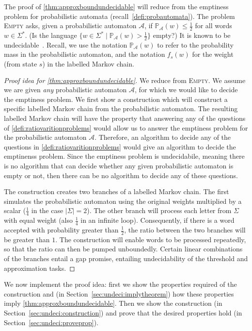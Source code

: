 \documentclass[10pt,a4paper]{amsart}
\numberwithin{equation}{section}
\theoremstyle{plain}
\theoremstyle{definition}
\theoremstyle{remark}
\newcommand\pr{\mathbb{P}}
\renewcommand\nu{f}
\begin{document}
\noindent The proof of \cref{thm:approxboundundecidable} will reduce from the emptiness problem for probabilistic automata (recall~\cref{defi:probautomata}). The problem \textsc{Empty} asks, given a probabilistic automaton $\mathcal{A}$,
if $\pr_\mathcal{A}(w) \le \frac{1}{2}$ for all words $w \in \Sigma^*$. (Is the language $\{w\in \Sigma^* \mid \pr_\mathcal{A}(w) > \frac{1}{2}\}$ empty?)
It is known to be undecidable~\cite{paz2014introduction,fijalkow2017undecidability}.   Recall, we use the notation $\pr_\mathcal{A}(w)$ to refer to the probability mass in the probabilistic automaton, and the notation $\nu_s(w)$ for the weight (from state $s$) in the labelled Markov chain.

\begin{proof}[Proof idea for \cref{thm:approxboundundecidable}] We reduce from \textsc{Empty}.
We assume we are given \emph{any} probabilistic automaton $\mathcal{A}$, for which we would like to decide the emptiness problem.
We first show a construction which will construct a specific labelled Markov chain from the probabilistic automaton.
The resulting labelled Markov chain will have the property that answering any of the questions of \cref{defi:ratiovaritionproblems} would allow us to answer the emptiness problem for the probabilistic automaton $\mathcal{A}$.
Therefore, an algorithm to decide any of the questions in \cref{defi:ratiovaritionproblems} would give an algorithm to decide the emptinenss problem.
Since the emptiness problem is undecidabile, meaning there is no algorithm that can decide whether any given probabilistic automaton is empty or not, then there can be no algorithm to decide any of these questions.

The construction creates two branches of a labelled Markov chain.
The first simulates the probabilistic automaton using the original weights multiplied by a scalar ($\frac{1}{4}$ in the case $|\Sigma| = 2$).
The other branch will process each letter from $\Sigma$ with equal weight (also $\frac{1}{4}$ in an infinite loop). Consequently,
 if there is a word accepted with probability greater than $\frac{1}{2}$, the ratio between the two branches will be greater than $1$.
 The construction will enable words to be processed repeatedly, so that the ratio can then be pumped unboundedly. Certain linear combinations of the branches entail a gap promise, entailing undecidability of the threshold and approximation tasks.
\end{proof}

We now implement the proof idea: first we show the properties required of the construction and (in Section~\ref{sec:undeci:implytheorem}) how these properties imply \cref{thm:approxboundundecidable}. Then we show the construction (in Section~\ref{sec:undeci:construction}) and prove that the desired properties hold (in Section~\ref{sec:undeci:proveprop}).
\end{document}
